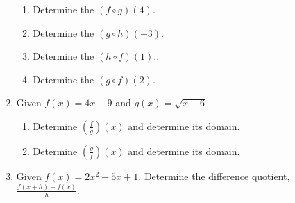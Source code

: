 \begin{enumerate}
\begin{enumerate}
\item Determine the $(f\circ g)(4)$.\vfill
\item Determine the $(g\circ h)(-3)$.\vfill
\item Determine the $(h\circ f)(1)$..\vfill
\item Determine the $(g\circ f)(2)$.\vfill
\end{enumerate}


\clearpage

\item Given $f(x)=4x-9$ and $g(x)=\sqrt{x+6}$
\begin{enumerate}
\item Determine $\displaystyle\left(\frac{f}{g}\right)(x)$ and determine its domain.
\vfill
\item Determine $\displaystyle\left(\frac{g}{f}\right)(x)$ and determine its domain.
\vfill
\end{enumerate}

\item Given $f(x)=2x^2-5x+1$.  Determine the difference quotient,
  $\displaystyle \frac{f(x+h)-f(x)}{h}$.
\vfill
\vfill



\end{enumerate}



